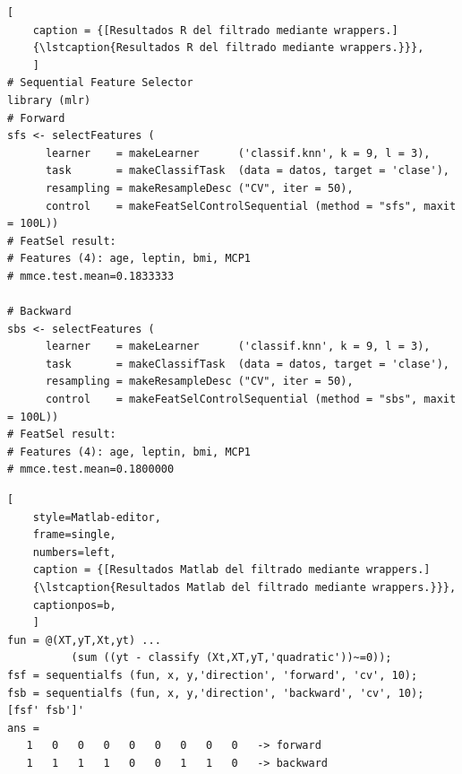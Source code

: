 \documentclass{article}
\newcommand{\lstcaption}[1]{\hyperref[lsts]{{#1}}}
\begin{document}
\begin{lstlisting}[
	caption = {[Resultados R del filtrado mediante wrappers.]
	{\lstcaption{Resultados R del filtrado mediante wrappers.}}},
	]
# Sequential Feature Selector
library (mlr)
# Forward
sfs <- selectFeatures (
      learner    = makeLearner      ('classif.knn', k = 9, l = 3),
      task       = makeClassifTask  (data = datos, target = 'clase'),
      resampling = makeResampleDesc ("CV", iter = 50),
      control    = makeFeatSelControlSequential (method = "sfs", maxit = 100L))
# FeatSel result:
# Features (4): age, leptin, bmi, MCP1
# mmce.test.mean=0.1833333

# Backward
sbs <- selectFeatures (
      learner    = makeLearner      ('classif.knn', k = 9, l = 3),
      task       = makeClassifTask  (data = datos, target = 'clase'),
      resampling = makeResampleDesc ("CV", iter = 50),
      control    = makeFeatSelControlSequential (method = "sbs", maxit = 100L))
# FeatSel result:
# Features (4): age, leptin, bmi, MCP1
# mmce.test.mean=0.1800000
\end{lstlisting}

\vfill
\begin{lstlisting}[
	style=Matlab-editor,
	frame=single,
	numbers=left,
	caption = {[Resultados Matlab del filtrado mediante wrappers.]
	{\lstcaption{Resultados Matlab del filtrado mediante wrappers.}}},
	captionpos=b,
	]
fun = @(XT,yT,Xt,yt) ...
	      (sum ((yt - classify (Xt,XT,yT,'quadratic'))~=0));
fsf = sequentialfs (fun, x, y,'direction', 'forward', 'cv', 10);
fsb = sequentialfs (fun, x, y,'direction', 'backward', 'cv', 10);
[fsf' fsb']'
ans =
   1   0   0   0   0   0   0   0   0   -> forward
   1   1   1   1   0   0   1   1   0   -> backward
\end{lstlisting}
\vfill



\end{document}
